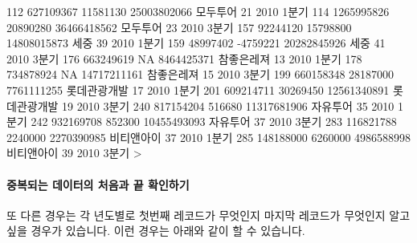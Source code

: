\begin{Schunk}
\begin{Soutput}
112  627109367   11581130 25003802066     모두투어   21 2010 1분기
114 1265995826   20890280 36466418562     모두투어   23 2010 3분기
157   92244120   15798800 14808015873         세중   39 2010 1분기
159   48997402   -4759221 20282845926         세중   41 2010 3분기
176  663249619         NA  8464425371   참좋은레져   13 2010 1분기
178  734878924         NA 14717211161   참좋은레져   15 2010 3분기
199  660158348   28187000  7761111255 롯데관광개발   17 2010 1분기
201  609214711   30269450 12561340891 롯데관광개발   19 2010 3분기
240  817154204     516680 11317681906     자유투어   35 2010 1분기
242  932169708     852300 10455493093     자유투어   37 2010 3분기
283  116821788    2240000  2270390985   비티앤아이   37 2010 1분기
285  148188000    6260000  4986588998   비티앤아이   39 2010 3분기
> 
\end{Soutput}
\end{Schunk}

\paragraph{중복되는 데이터의 처음과 끝 확인하기}
또 다른 경우는 각 년도별로 첫번째 레코드가 무엇인지 마지막 레코드가 무엇인지 알고 싶을 경우가 있습니다. 
이런 경우는 아래와 같이 할 수 있습니다. 

